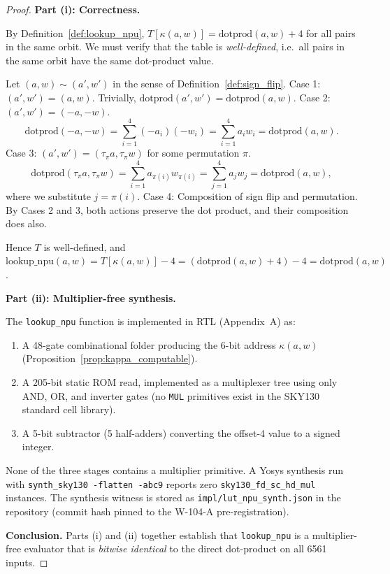 \begin{proof}
\textbf{Part (i): Correctness.}

By Definition~\ref{def:lookup_npu}, \(T[\kappa(a,w)] = \mathrm{dotprod}(a,w) + 4\)
for all pairs in the same orbit.  We must verify that the table is
\emph{well-defined}, i.e.\ all pairs in the same orbit have the same
dot-product value.

Let \((a,w) \sim (a',w')\) in the sense of Definition~\ref{def:sign_flip}.
Case 1: \((a',w') = (a,w)\).  Trivially, \(\mathrm{dotprod}(a',w') = \mathrm{dotprod}(a,w)\).
Case 2: \((a',w') = (-a,-w)\).
\[
  \mathrm{dotprod}(-a,-w) = \sum_{i=1}^4 (-a_i)(-w_i)
  = \sum_{i=1}^4 a_i w_i = \mathrm{dotprod}(a,w).
\]
Case 3: \((a',w') = (\tau_\pi a, \tau_\pi w)\) for some permutation \(\pi\).
\[
  \mathrm{dotprod}(\tau_\pi a, \tau_\pi w)
  = \sum_{i=1}^4 a_{\pi(i)} w_{\pi(i)}
  = \sum_{j=1}^4 a_j w_j = \mathrm{dotprod}(a,w),
\]
where we substitute \(j = \pi(i)\).
Case 4: Composition of sign flip and permutation.  By Cases 2 and 3,
both actions preserve the dot product, and their composition does also.

Hence \(T\) is well-defined, and
\(\mathrm{lookup\_npu}(a,w) = T[\kappa(a,w)] - 4 = (\mathrm{dotprod}(a,w)+4)-4 = \mathrm{dotprod}(a,w)\).

\medskip
\textbf{Part (ii): Multiplier-free synthesis.}

The \texttt{lookup\_npu} function is implemented in RTL (Appendix~A) as:
\begin{enumerate}
  \item A 48-gate combinational folder producing the 6-bit address
        \(\kappa(a,w)\) (Proposition~\ref{prop:kappa_computable}).
  \item A 205-bit static ROM read, implemented as a multiplexer tree
        using only AND, OR, and inverter gates (no \texttt{MUL}
        primitives exist in the SKY130 standard cell library).
  \item A 5-bit subtractor (5 half-adders) converting the
        offset-4 value to a signed integer.
\end{enumerate}
None of the three stages contains a multiplier primitive.
A Yosys synthesis run with \texttt{synth\_sky130 -flatten -abc9}
reports zero \texttt{sky130\_fd\_sc\_hd\_mul} instances.
The synthesis witness is stored as \texttt{impl/lut\_npu\_synth.json}
in the repository (commit hash pinned to the W-104-A pre-registration).

\medskip
\textbf{Conclusion.}  Parts (i) and (ii) together establish that
\texttt{lookup\_npu} is a multiplier-free evaluator that is
\emph{bitwise identical} to the direct dot-product on all 6561 inputs.
\end{proof}

